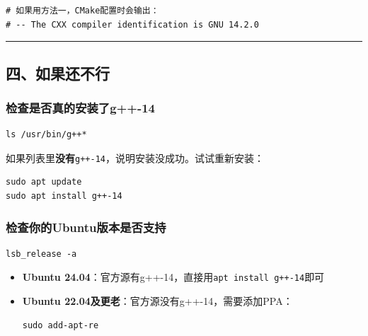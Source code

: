 \documentclass[11pt, a4paper]{article}
\begin{document}
\begin{aibox}
\begin{tcolorbox}[colback=white,colframe=gray!50!white,boxrule=0.5pt,arc=2pt,left=5pt,right=5pt,top=5pt,bottom=5pt]
\begin{verbatim}
# 如果用方法一，CMake配置时会输出：
# -- The CXX compiler identification is GNU 14.2.0
\end{verbatim}
\end{tcolorbox}

\begin{center}\rule{\textwidth}{0.4pt}\end{center}

\subsection*{四、如果还不行}

\subsubsection*{检查是否真的安装了g++-14}

\begin{tcolorbox}[colback=white,colframe=gray!50!white,boxrule=0.5pt,arc=2pt,left=5pt,right=5pt,top=5pt,bottom=5pt]
\begin{verbatim}
ls /usr/bin/g++*
\end{verbatim}
\end{tcolorbox}

如果列表里\textbf{没有}\texttt{g++-14}，说明安装没成功。试试重新安装：

\begin{tcolorbox}[colback=white,colframe=gray!50!white,boxrule=0.5pt,arc=2pt,left=5pt,right=5pt,top=5pt,bottom=5pt]
\begin{verbatim}
sudo apt update
sudo apt install g++-14
\end{verbatim}
\end{tcolorbox}

\subsubsection*{检查你的Ubuntu版本是否支持}

\begin{tcolorbox}[colback=white,colframe=gray!50!white,boxrule=0.5pt,arc=2pt,left=5pt,right=5pt,top=5pt,bottom=5pt]
\begin{verbatim}
lsb_release -a
\end{verbatim}
\end{tcolorbox}

\begin{itemize}
    \item \textbf{Ubuntu 24.04}：官方源有g++-14，直接用\texttt{apt install g++-14}即可
    \item \textbf{Ubuntu 22.04及更老}：官方源没有g++-14，需要添加PPA：
\begin{tcolorbox}[colback=white,colframe=gray!50!white,boxrule=0.5pt,arc=2pt,left=5pt,right=5pt,top=5pt,bottom=5pt]
\begin{verbatim}
sudo add-apt-re
\end{verbatim}
\end{tcolorbox}
\end{itemize}

\end{aibox}
\end{document}

